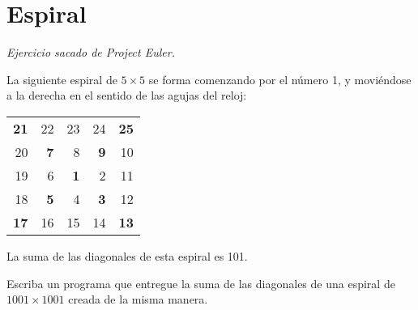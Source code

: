 \section{Espiral}

\emph{Ejercicio sacado de Project Euler\footnotemark.}

La siguiente espiral de \(5 × 5\) se forma comenzando por el número 1, y
moviéndose a la derecha en el sentido de las agujas del reloj:

\begin{tabular}{*{5}{r}}
  \textbf{21} &         22  &         23  &         24  & \textbf{25} \\
          20  & \textbf{ 7} &          8  & \textbf{ 9} &         10  \\
          19  &          6  & \textbf{ 1} &          2  &         11  \\
          18  & \textbf{ 5} &          4  & \textbf{ 3} &         12  \\
  \textbf{17} &         16  &         15  &         14  & \textbf{13} \\
\end{tabular}

La suma de las diagonales de esta espiral es 101.

Escriba un programa que entregue la suma de las diagonales de una
espiral de \(1001 × 1001\) creada de la misma manera.
